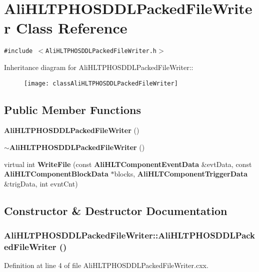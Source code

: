 \section{Ali\-HLTPHOSDDLPacked\-File\-Writer Class Reference}
\label{classAliHLTPHOSDDLPackedFileWriter}
{\tt \#include $<$Ali\-HLTPHOSDDLPacked\-File\-Writer.h$>$}

Inheritance diagram for Ali\-HLTPHOSDDLPacked\-File\-Writer::\begin{figure}[H]
\begin{center}
\leavevmode
\texttt{[image: classAliHLTPHOSDDLPackedFileWriter]}
\end{center}
\end{figure}
\subsection*{Public Member Functions}
\begin{CompactItemize}
\item 
{\bf Ali\-HLTPHOSDDLPacked\-File\-Writer} ()
\item 
{\bf $\sim$Ali\-HLTPHOSDDLPacked\-File\-Writer} ()
\item 
virtual int {\bf Write\-File} (const {\bf Ali\-HLTComponent\-Event\-Data} \&evt\-Data, const {\bf Ali\-HLTComponent\-Block\-Data} $\ast$blocks, {\bf Ali\-HLTComponent\-Trigger\-Data} \&trig\-Data, int evnt\-Cnt)
\end{CompactItemize}


\subsection{Constructor \& Destructor Documentation}
\subsubsection{\setlength{\rightskip}{0pt plus 5cm}Ali\-HLTPHOSDDLPacked\-File\-Writer::Ali\-HLTPHOSDDLPacked\-File\-Writer ()}\label{classAliHLTPHOSDDLPackedFileWriter_a0}




Definition at line 4 of file Ali\-HLTPHOSDDLPacked\-File\-Writer.cxx.

